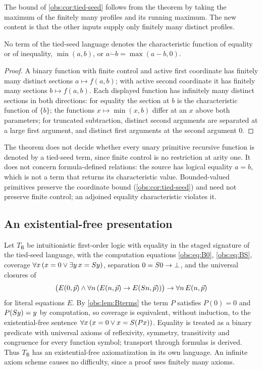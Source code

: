 The bound of \cref{obs:cor:tied-seed} follows from the theorem by taking the
maximum of the finitely many profiles and its running maximum. The new content
is that the other inputs supply only finitely many distinct profiles.

\begin{corollary}
\label{obs:cor:fc-excluded}
No term of the tied-seed language denotes the characteristic function of
equality or of inequality, $\min(a,b)$, or
$a\mathbin{\dot{-}}b=\max(a-b,0)$.
\end{corollary}

\begin{proof}
A binary function with finite control and active first coordinate has finitely
many distinct sections $a\mapsto f(a,b)$; with active second coordinate it has
finitely many sections $b\mapsto f(a,b)$. Each displayed function has
infinitely many distinct sections in both directions: for equality the section
at $b$ is the characteristic function of $\{b\}$; the functions
$x\mapsto\min(x,b)$ differ at an $x$ above both parameters; for truncated
subtraction, distinct second arguments are separated at a large first argument,
and distinct first arguments at the second argument $0$.
\end{proof}

\begin{remark}
The theorem does not decide whether every unary primitive recursive function is
denoted by a tied-seed term, since finite control is no restriction at arity
one. It does not concern formula-defined relations: the source has logical
equality $a=b$, which is not a term that returns its characteristic value.
Bounded-valued primitives preserve the coordinate bound
(\cref{obs:cor:tied-seed}) and need not preserve finite control; an adjoined
equality characteristic violates it.
\end{remark}

\subsection{An existential-free presentation}

Let $T_{\mathsf{B}}$ be intuitionistic first-order logic with equality in the
staged signature of the tied-seed language, with the computation equations
\eqref{obs:eq:B0}, \eqref{obs:eq:BS}, coverage
$\forall x\,(x=0\vee\exists y\,x=S y)$, separation $0=S 0\to\bot$, and
the universal closures of
\[
\bigl(E(0,\vec p)\wedge\forall n\,(E(n,\vec p)\to E(S n,\vec p))\bigr)\to\forall n\,E(n,\vec p)
\]
for literal equations $E$. By \cref{obs:lem:Bterms} the term $P$ satisfies
$P(0)=0$ and $P(S y)=y$ by computation, so coverage is equivalent, without
induction, to the existential-free sentence
$\forall x\,(x=0\vee x=S(Px))$. Equality is treated as a binary predicate
with universal axioms of reflexivity, symmetry, transitivity and congruence for
every function symbol; transport through formulas is derived. Thus
$T_{\mathsf{B}}$ has an existential-free axiomatization in its own language.
An infinite axiom scheme causes no difficulty, since a proof uses finitely many
axioms.

